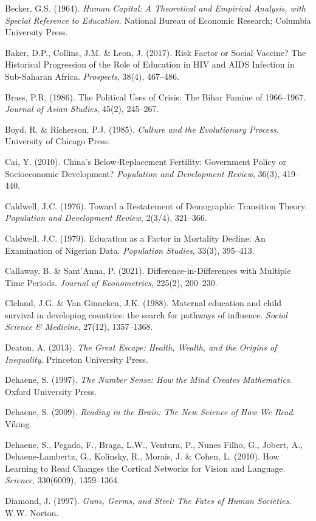 \documentclass[12pt,letterpaper]{article}
\begin{document}
Becker, G.S. (1964). \emph{Human Capital: A Theoretical and Empirical
Analysis, with Special Reference to Education}. National Bureau of
Economic Research; Columbia University Press.

Baker, D.P., Collins, J.M. \& Leon, J. (2017). Risk Factor or Social
Vaccine? The Historical Progression of the Role of Education in HIV and
AIDS Infection in Sub-Saharan Africa. \emph{Prospects}, 38(4), 467--486.

Brass, P.R. (1986). The Political Uses of Crisis: The Bihar Famine of
1966--1967. \emph{Journal of Asian Studies}, 45(2), 245--267.

Boyd, R. \& Richerson, P.J. (1985). \emph{Culture and the Evolutionary
Process}. University of Chicago Press.

Cai, Y. (2010). China's Below-Replacement Fertility: Government Policy
or Socioeconomic Development? \emph{Population and Development Review},
36(3), 419--440.

Caldwell, J.C. (1976). Toward a Restatement of Demographic Transition
Theory. \emph{Population and Development Review}, 2(3/4), 321--366.

Caldwell, J.C. (1979). Education as a Factor in Mortality Decline:
An Examination of Nigerian Data. \emph{Population Studies}, 33(3),
395--413.

Callaway, B. \& Sant'Anna, P. (2021). Difference-in-Differences with
Multiple Time Periods. \emph{Journal of Econometrics}, 225(2), 200--230.

Cleland, J.G. \& Van Ginneken, J.K. (1988). Maternal education and
child survival in developing countries: the search for pathways of
influence. \emph{Social Science \& Medicine}, 27(12), 1357--1368.

Deaton, A. (2013). \emph{The Great Escape: Health, Wealth, and the
Origins of Inequality}. Princeton University Press.

Dehaene, S. (1997). \emph{The Number Sense: How the Mind Creates
Mathematics}. Oxford University Press.

Dehaene, S. (2009). \emph{Reading in the Brain: The New Science of
How We Read}. Viking.

Dehaene, S., Pegado, F., Braga, L.W., Ventura, P., Nunes Filho, G.,
Jobert, A., Dehaene-Lambertz, G., Kolinsky, R., Morais, J. \& Cohen, L.
(2010). How Learning to Read Changes the Cortical Networks for Vision and
Language. \emph{Science}, 330(6009), 1359--1364.

Diamond, J. (1997). \emph{Guns, Germs, and Steel: The Fates of Human
Societies}. W.W. Norton.
\end{document}
